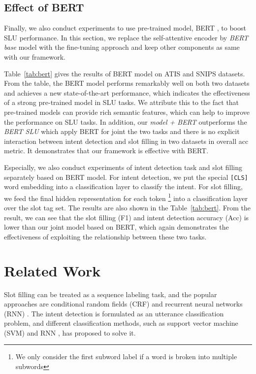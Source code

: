 \documentclass[11pt,a4paper]{article}
\begin{document}
\subsection{Effect of BERT}
Finally, we also conduct experiments to use pre-trained model, BERT \cite{devlin2018bert}, to boost SLU performance. 
In this section, we replace the self-attentive encoder by \textit{BERT base} model
with the 
fine-tuning approach and keep other components as same with our framework.

Table~\ref{tab:bert} gives the results of BERT 
model on ATIS and SNIPS datasets. From the table, the
BERT model performs remarkably well on both two
datasets and achieves a new state-of-the-art performance, which
indicates the effectiveness of a strong pre-trained model in 
SLU tasks. We attribute this to the fact that 
pre-trained models can provide rich semantic features,
which can help to improve the performance on SLU tasks.
In addition, our \textit{model + BERT} outperforms the \textit{BERT SLU} \cite{chen2019bert} which apply BERT for joint the two tasks and there is no explicit interaction between intent detection and slot filling in two datasets in overall acc metric. It demonstrates that our framework is effective with BERT. 

Especially, we also conduct experiments of intent detection task and slot filling separately based on BERT model. For intent detection,
we put the special \texttt{[CLS]} word embedding into a classification layer to classify the intent. For slot filling, we
feed the final hidden representation    for each token  \footnote{We only consider the first subword label if a word is broken into multiple subwords} into a classification layer 
over the slot tag set. 
The results are also shown in the Table~\ref{tab:bert}. From the result, we can see that the slot filling 
(F1) and intent detection accuracy (Acc) is lower than our joint model based on BERT, which again demonstrates the effectiveness of exploiting the relationship between these two tasks. 

\section{Related Work}
Slot filling can be treated as a sequence labeling task, and the popular approaches are conditional random fields (CRF) \cite{raymond2007generative} and recurrent neural networks (RNN) \cite{xu2013convolutional,yao2014spoken}. 
The intent detection is formulated as an utterance classification problem,
and different classification methods, such as support vector machine (SVM) and RNN \cite{haffner2003optimizing,sarikaya2011deep},  has proposed to solve it.
\end{document}
